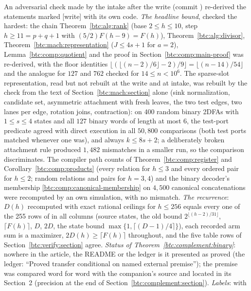 \begin{writenote}
An adversarial check made by the intake after the write (commit
) re-derived the statements marked [write] with its own code.
\emph{The headline bound}, checked the hardest: the chain
Theorem~\ref{btc:alg:rank} (base $2\le h\le10$, step $h\ge11=p+q+1$ with
$(5/2)F(h-9)=F(h)$), Theorem~\ref{btc:alg:divisor},
Theorem~\ref{btc:mach:representation} ($J\le4s+1$ for $a=2$),
Lemma~\ref{btc:comp:quotient} and the proof in
Section~\ref{btc:comp:main-proof} was re-derived, with the floor identities
$\lfloor(\lfloor(n-2)/6\rfloor-2)/9\rfloor=\lfloor(n-14)/54\rfloor$ and the
analogue for $127$ and $762$ checked for $14\le n<10^6$. The sparse-slot
representation, read but not rebuilt at the write and at intake, was rebuilt
by the check from the text of Section~\ref{btc:mach:section} alone (sink
normalization, candidate set, asymmetric attachment with fresh leaves, the
two test edges, two lanes per edge, rotation joins, contraction): on 400
random binary 2DFAs with $1\le s\le4$ states and all $127$ binary words of
length at most $6$, the test-port predicate agreed with direct execution in
all $50{,}800$ comparisons (both test ports matched whenever one was), and
always $k\le8s+2$; a deliberately broken attachment rule produced $1{,}482$
mismatches in a smaller run, so the comparison discriminates. The compiler
path counts of Theorem~\ref{btc:comp:register} and
Corollary~\ref{btc:comp:products} (every relation for $h\le3$ and every
ordered pair for $h\le2$; random relations and pairs for $h=3,4$) and the
binary decoder's
membership \eqref{btc:comp:canonical-membership} on $4{,}500$ canonical
concatenations were recomputed by an own simulation, with no mismatch.
\emph{The recurrence}: $D(h)$ recomputed with exact rational ceilings for
$h\le256$ equals every one of the 255 rows of
 in all columns (source states, the
old bound $2^{\lfloor(h-2)/31\rfloor}$, $\lceil F(h)\rceil$, $D$, $2D$, the
state bound $\max\{1,\lceil(D-1)/4\rceil\}$), each recorded arm sum is a
maximizer, $2D(h)\ge\lceil F(h)\rceil$ throughout, and the five table rows
of Section~\ref{btc:verify:section} agree. \emph{Status of
Theorem~\ref{btc:complement:binary}}: nowhere in the article, the README or
the ledger is it presented as proved (the ledger: ``Proved transfer
conditional on named external premise''); the premise was compared word for
word with the companion's source and located in its Section~2 (precision at
the end of Section~\ref{btc:complement:section}). \emph{Labels}: with

\end{writenote}
